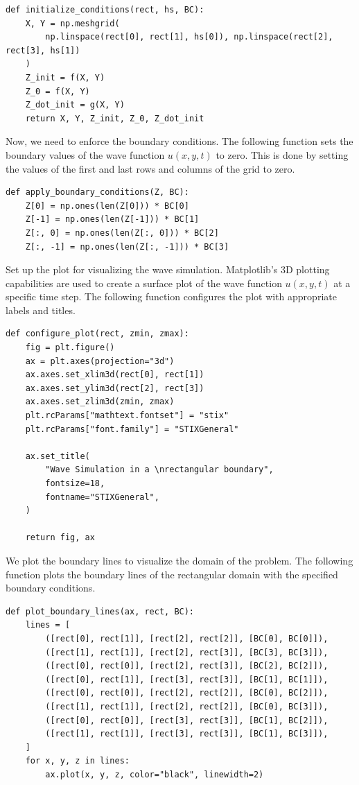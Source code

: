 \documentclass{article}
\begin{document}
\begin{lstlisting}[style=Python, caption={Initialize Conditions}]
def initialize_conditions(rect, hs, BC):
    X, Y = np.meshgrid(
        np.linspace(rect[0], rect[1], hs[0]), np.linspace(rect[2], rect[3], hs[1])
    )
    Z_init = f(X, Y)
    Z_0 = f(X, Y)
    Z_dot_init = g(X, Y)
    return X, Y, Z_init, Z_0, Z_dot_init
\end{lstlisting}

Now, we need to enforce the boundary conditions. The following function sets the
boundary values of the wave function \(u(x, y, t)\) to zero. This is done by
setting the values of the first and last rows and columns of the grid to zero.

\begin{lstlisting}[style=Python, caption={Apply Boundary Conditions}]
def apply_boundary_conditions(Z, BC):
    Z[0] = np.ones(len(Z[0])) * BC[0]
    Z[-1] = np.ones(len(Z[-1])) * BC[1]
    Z[:, 0] = np.ones(len(Z[:, 0])) * BC[2]
    Z[:, -1] = np.ones(len(Z[:, -1])) * BC[3]
\end{lstlisting}

Set up the plot for visualizing the wave simulation. Matplotlib's 3D plotting
capabilities are used to create a surface plot of the wave function \(u(x, y,
t)\) at a specific time step. The following function configures the plot with
appropriate labels and titles.

\begin{lstlisting}[style=Python, caption={Configure Plot}]
def configure_plot(rect, zmin, zmax):
    fig = plt.figure()
    ax = plt.axes(projection="3d")
    ax.axes.set_xlim3d(rect[0], rect[1])
    ax.axes.set_ylim3d(rect[2], rect[3])
    ax.axes.set_zlim3d(zmin, zmax)
    plt.rcParams["mathtext.fontset"] = "stix"
    plt.rcParams["font.family"] = "STIXGeneral"

    ax.set_title(
        "Wave Simulation in a \nrectangular boundary",
        fontsize=18,
        fontname="STIXGeneral",
    )

    return fig, ax
\end{lstlisting}

We plot the boundary lines to visualize the domain of the problem. The
following function plots the boundary lines of the rectangular domain with the
specified boundary conditions.

\begin{lstlisting}[style=Python, caption={Plot Boundary Lines}]
def plot_boundary_lines(ax, rect, BC):
    lines = [
        ([rect[0], rect[1]], [rect[2], rect[2]], [BC[0], BC[0]]),
        ([rect[1], rect[1]], [rect[2], rect[3]], [BC[3], BC[3]]),
        ([rect[0], rect[0]], [rect[2], rect[3]], [BC[2], BC[2]]),
        ([rect[0], rect[1]], [rect[3], rect[3]], [BC[1], BC[1]]),
        ([rect[0], rect[0]], [rect[2], rect[2]], [BC[0], BC[2]]),
        ([rect[1], rect[1]], [rect[2], rect[2]], [BC[0], BC[3]]),
        ([rect[0], rect[0]], [rect[3], rect[3]], [BC[1], BC[2]]),
        ([rect[1], rect[1]], [rect[3], rect[3]], [BC[1], BC[3]]),
    ]
    for x, y, z in lines:
        ax.plot(x, y, z, color="black", linewidth=2)
\end{lstlisting}
\end{document}
